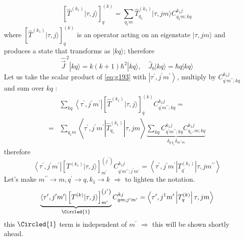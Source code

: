 \documentclass[12pt]{article}
\newcommand{\be}{\begin{equation}}
\newcommand{\ee}{\end{equation}}
\begin{document}
\be
\left[\hat{T}^{(k_{1})}|\tau, j\rangle\right]_{q}^{(k)}=\sum_{q_{1} m} \hat{T}_{q_{1}}^{(k_{1})}|\tau, j m\rangle C_{q_{1} m ; k q}^{k_{1} j}
\label{eq:g193}
\ee
where $\left[\hat{T}^{(k_{1})}|\tau, j\rangle\right]_{q}^{(k)}$ is an
operator acting on an eigenstate \(|\tau, j m\rangle\) and produces a
state that transforms as \(|k q\rangle\); therefore
\[
{\hat{\vec{J}}}^{\,2}|k q\rangle=k(k+1) \hbar^{2}|k q\rangle, \quad \hat{J}_{0}|k q\rangle=\hbar q|k q\rangle
\]
Let us take the scalar product of \eqref{eq:g193} with \(\left|\tau^{\prime}, j^{\prime} m^{\prime}\right\rangle\),
multiply by \(C_{q^{\prime} m^{\prime \prime} ; k q}^{k_{1}j}\) and sum over \(k q\) :
\[
\begin{aligned} 
& \sum_{k q}\left\langle\tau^{\prime}, j^{\prime} m^{\prime}\right|\left[\hat{T}^{\left(k_{1}\right)}|\tau, j\rangle\right]_{q}^{(k)} C_{q^{\prime} m^{\prime \prime} ; k q}^{k_{1} j}=\\
=& \sum_{q_{1} m}\left\langle\tau^{\prime}, j^{\prime} m^{\prime}\left|\hat{T}_{q_{1}}^{\left(k_{1}\right)}\right| \tau, j m\right\rangle \underbrace{\sum_{k q} C_{q^{\prime} m^{\prime \prime} ; k q}^{k_{1} j} C_{q_{1}, m ; k q}^{k_{1} j}}%
_{\delta_{q^{\prime} q_{1}}\delta_{m^{\prime \prime} m}}
\end{aligned}
\]
therefore
\[
\left\langle\tau^{\prime}, j^{\prime} m^{\prime}\right|\left[T^{\left(k_{1}\right)}|\tau, j\rangle\right]_{m^{\prime}}^{\left(j^{\prime}\right)} C_{q^{\prime} m^{\prime \prime} ; j^{\prime} m^{\prime}}^{k_{1} j}=\left\langle\tau^{\prime}, j^{\prime} m^{\prime}\left|T_{q^{\prime}}^{\left(k_{1}\right)}\right| \tau, j m^{\prime \prime}\right\rangle
\]
Let's make $m^{\prime \prime} \rightarrow m, q^{\prime} \rightarrow q, k_{1} \rightarrow k$ $\Rightarrow$ to lighten the notation.
\be
\underbrace{\left\langle\tau^{\prime}, j^{\prime} m^{\prime}\right|\left[T^{(k)}|\tau, j\rangle\right]_{m^{\prime}}^{\left(j^{\prime}\right)}}%
_{\Circled{1}} 
C_{q m ; j^{\prime} m^{\prime}}^{k j} =\left\langle\tau^{\prime}, j^{1} m^{\prime}\left|T_{q}^{(k)}\right| \tau, j m\right\rangle
\ee
this $\Circled{1}$ term is independent of $m^\prime$ $\Rightarrow$ this will be shown shortly ahead.

\end{document}
